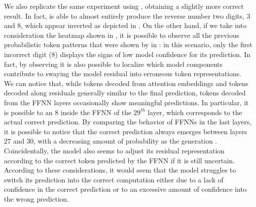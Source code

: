 We also replicate the same experiment using , obtaining a slightly more correct result.
In fact,  is able to almost entirely produce the reverse number  two digits, $3$ and $8$, which appear inverted as depicted in .
On the other hand, if we take into consideration the heatmap shown in , it is possible to observe all the previous probabilistic token patterns that were shown by  in : in this scenario, only the first incorrect digit ($8$) displays the signs of low model confidence for its prediction.
In fact, by observing  it is also possible to localize which model components contribute to swaying the model residual into erroneous token representations.
We can notice that, while tokens decoded from attention embeddings  and tokens decoded along residuals  generally similar to the final prediction, tokens decoded from the FFNN layers occasionally show meaningful predictions.
In particular, it is possible to  an $8$ inside the FFNN of the $29^{th}$ layer, which corresponds to the actual correct prediction.
By comparing the behavior of FFNNs in the last layers, it is possible to notice that the correct prediction always emerges between layers $27$ and $30$, with a decreasing amount of probability as the generation .
Coincidentally, the model also seems to adjust its residual representation according to the correct token predicted by the FFNN if it is still uncertain.
According to these considerations, it would seem that the model struggles to switch its prediction into the correct computation either due to a lack of confidence in the correct prediction or to an excessive amount of confidence into the wrong prediction.


